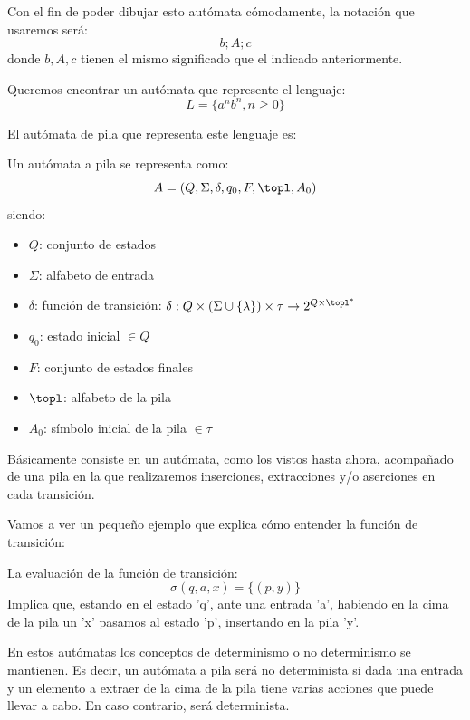 \documentclass{apuntes}
\begin{document}
Con el fin de poder dibujar esto autómata cómodamente, la notación que usaremos será:
\[b;A;c\]
donde $b,A,c$ tienen el mismo significado que el indicado anteriormente.

\begin{example}
Queremos encontrar un autómata que represente el lenguaje:
\[L = \lbrace a^nb^n, n \geq 0\rbrace\]

El autómata de pila que representa este lenguaje es:
\end{example}

\begin{defn}
Un autómata a pila se representa como:
\[A=(Q, \Sigma, \delta, q_0, F, \topl, A_0)\]
siendo:
\begin{itemize}
\item $Q$: conjunto de estados
\item $\Sigma$: alfabeto de entrada
\item $\delta$: función de transición: $\delta:Q\times(\Sigma \cup \{\lambda\})\times \tau \rightarrow 2^{Q\times \topl^*}$
\item $q_0$: estado inicial $\in Q$
\item $F$: conjunto de estados finales
\item $\topl$: alfabeto de la pila
\item $A_0$: símbolo inicial de la pila $\in \tau$
\end{itemize}
Básicamente consiste en un autómata, como los vistos hasta ahora, acompañado de una pila en la que realizaremos inserciones, extracciones y/o aserciones en cada transición.
\end{defn}

Vamos a ver un pequeño ejemplo que explica cómo entender la función de transición:
\begin{example}
La evaluación de la función de transición:
\[\sigma(q,a,x)=\{(p,y)\}\]
Implica que, estando en el estado 'q', ante una entrada 'a', habiendo en la cima de la pila un 'x' pasamos al estado 'p', insertando en la pila 'y'.
\end{example}

En estos autómatas los conceptos de determinismo o no determinismo se mantienen. Es decir, un autómata a pila será no determinista si dada una entrada y un elemento a extraer de la cima de la pila tiene varias acciones que puede llevar a cabo. En caso contrario, será determinista.
\end{document}
